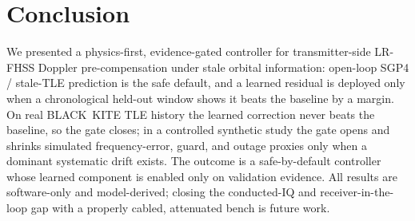 \documentclass[conference]{IEEEtran}
\begin{document}
\section{Conclusion}
\label{sec:conclusion}

We presented a physics-first, evidence-gated controller for transmitter-side
LR-FHSS Doppler pre-compensation under stale orbital information: open-loop SGP4 /
stale-TLE prediction is the safe default, and a learned residual is deployed only
when a chronological held-out window shows it beats the baseline by a margin. On
real BLACK~KITE TLE history the learned correction never beats the baseline, so
the gate closes; in a controlled synthetic study the gate opens and shrinks
simulated frequency-error, guard, and outage proxies only when a dominant
systematic drift exists. The outcome is a safe-by-default controller whose learned
component is enabled only on validation evidence. All results are software-only and
model-derived; closing the conducted-IQ and receiver-in-the-loop gap with a
properly cabled, attenuated bench is future work.



\end{document}
